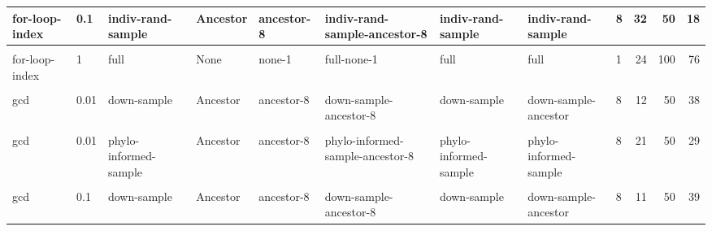 \documentclass[
]{book}
\begin{document}
\begin{table}
\begin{tabular}{l|l|l|l|l|l|l|l|l|r|r|r}
\hline
for-loop-index & 0.1 & indiv-rand-sample & Ancestor & ancestor-8 & indiv-rand-sample-ancestor-8 & indiv-rand-sample & indiv-rand-sample & 8 & 32 & 50 & 18\\
\hline
\cellcolor{gray!6}{for-loop-index} & \cellcolor{gray!6}{0.1} & \cellcolor{gray!6}{phylo-informed-sample} & \cellcolor{gray!6}{Ancestor} & \cellcolor{gray!6}{ancestor-8} & \cellcolor{gray!6}{phylo-informed-sample-ancestor-8} & \cellcolor{gray!6}{phylo-informed-sample} & \cellcolor{gray!6}{phylo-informed-sample} & \cellcolor{gray!6}{8} & \cellcolor{gray!6}{27} & \cellcolor{gray!6}{50} & \cellcolor{gray!6}{23}\\
\hline
for-loop-index & 1 & full & None & none-1 & full-none-1 & full & full & 1 & 24 & 100 & 76\\
\hline
\cellcolor{gray!6}{gcd} & \cellcolor{gray!6}{0.01} & \cellcolor{gray!6}{down-sample} & \cellcolor{gray!6}{None} & \cellcolor{gray!6}{none-1} & \cellcolor{gray!6}{down-sample-none-1} & \cellcolor{gray!6}{down-sample} & \cellcolor{gray!6}{down-sample} & \cellcolor{gray!6}{1} & \cellcolor{gray!6}{0} & \cellcolor{gray!6}{50} & \cellcolor{gray!6}{50}\\
\hline
gcd & 0.01 & down-sample & Ancestor & ancestor-8 & down-sample-ancestor-8 & down-sample & down-sample-ancestor & 8 & 12 & 50 & 38\\
\hline
\cellcolor{gray!6}{gcd} & \cellcolor{gray!6}{0.01} & \cellcolor{gray!6}{indiv-rand-sample} & \cellcolor{gray!6}{Ancestor} & \cellcolor{gray!6}{ancestor-8} & \cellcolor{gray!6}{indiv-rand-sample-ancestor-8} & \cellcolor{gray!6}{indiv-rand-sample} & \cellcolor{gray!6}{indiv-rand-sample} & \cellcolor{gray!6}{8} & \cellcolor{gray!6}{18} & \cellcolor{gray!6}{50} & \cellcolor{gray!6}{32}\\
\hline
gcd & 0.01 & phylo-informed-sample & Ancestor & ancestor-8 & phylo-informed-sample-ancestor-8 & phylo-informed-sample & phylo-informed-sample & 8 & 21 & 50 & 29\\
\hline
\cellcolor{gray!6}{gcd} & \cellcolor{gray!6}{0.1} & \cellcolor{gray!6}{down-sample} & \cellcolor{gray!6}{None} & \cellcolor{gray!6}{none-1} & \cellcolor{gray!6}{down-sample-none-1} & \cellcolor{gray!6}{down-sample} & \cellcolor{gray!6}{down-sample} & \cellcolor{gray!6}{1} & \cellcolor{gray!6}{2} & \cellcolor{gray!6}{50} & \cellcolor{gray!6}{48}\\
\hline
gcd & 0.1 & down-sample & Ancestor & ancestor-8 & down-sample-ancestor-8 & down-sample & down-sample-ancestor & 8 & 11 & 50 & 39\\
\hline

\end{tabular}
\end{table}
\end{document}
